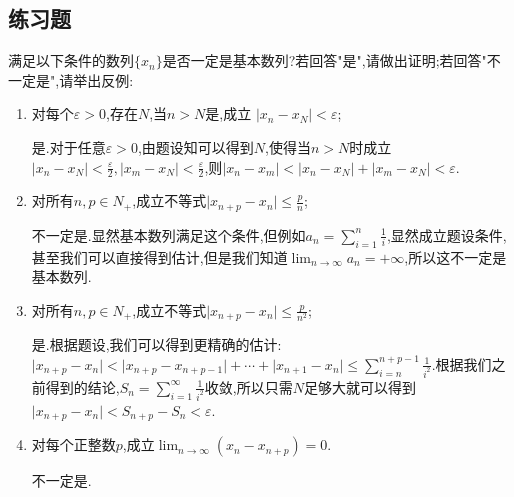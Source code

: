\documentclass[cn,chinese,fontset]{elegantbook}
\begin{document}
            \subsection{练习题}
            \begin{exercise}
                满足以下条件的数列$\{x_n\}$是否一定是基本数列?若回答"是",请做出证明;若回答"不一定是",请举出反例:
                \begin{enumerate}
                    \item 对每个$\varepsilon>0$,存在$N$,当$n>N$是,成立
                    $\lvert x_n-x_N\rvert<\varepsilon$;
                    \begin{solution}
                        是.对于任意$\varepsilon>0$,由题设知可以得到$N$,使得当$n>N$时成立$\lvert x_n-x_N\rvert<\frac{\varepsilon}{2},\lvert x_m-x_N\rvert<\frac{\varepsilon}{2}$,则$\lvert x_n-x_m\rvert<\lvert x_n-x_N\rvert+\lvert x_m-x_N\rvert<\varepsilon$.
                    \end{solution}
                    \item 对所有$n,p\in N_+$,成立不等式$\lvert x_{n+p}-x_n\rvert\leqslant\frac{p}{n}$;
                    \begin{solution}
                        不一定是.显然基本数列满足这个条件,但例如$a_n=\sum_{i=1}^{n}\frac{1}{i}$,显然成立题设条件,甚至我们可以直接得到估计,但是我们知道$\lim_{n\to\infty}a_n=+\infty$,所以这不一定是基本数列.
                    \end{solution}
                    \item 对所有$n,p\in N_+$,成立不等式$\lvert x_{n+p}-x_n\rvert\leqslant\frac{p}{n^2}$;
                    \begin{solution}
                        是.根据题设,我们可以得到更精确的估计:$\lvert x_{n+p}-x_n\rvert<\lvert x_{n+p}-x_{n+p-1}\rvert+\cdots+\lvert x_{n+1}-x_{n}\rvert\leqslant\sum_{i=n}^{n+p-1}\frac{1}{i^2}$.根据我们之前得到的结论,$S_n=\sum_{i=1}^{\infty}\frac{1}{i^2}$收敛,所以只需$N$足够大就可以得到$\lvert x_{n+p}-x_n\rvert<S_{n+p}-S_n<\varepsilon$.
                    \end{solution}
                    \item 对每个正整数$p$,成立$\lim_{n\to\infty}(x_n-x_{n+p})=0$.
                    \begin{solution}
                        不一定是.
                    \end{solution}
                \end{enumerate}
            \end{exercise}
\end{document}
